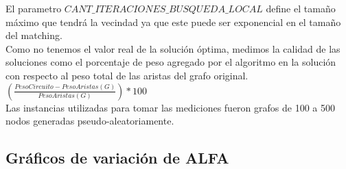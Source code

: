 \documentclass[11pt, a4paper, spanish]{article}
\begin{document}
\noindent El parametro $CANT\_ITERACIONES\_BUSQUEDA\_LOCAL$ define el tama\~{n}o m\'aximo que tendr\'a la vecindad ya que este puede ser exponencial en el tama\~{n}o del matching.\\


Como no tenemos el valor real de la soluci\'on \'optima, medimos la calidad de las soluciones como el porcentaje de peso agregado por el algoritmo en la soluci\'on con respecto al peso total de las aristas del grafo original. $\left(\frac{PesoCircuito - PesoAristas(G)}{PesoAristas(G)}\right)*100$\\
Las instancias utilizadas para tomar las mediciones fueron grafos de 100 a 500 nodos generadas pseudo-aleatoriamente.\\

\newpage
\subsection{Gr\'aficos de variaci\'on de ALFA}
\end{document}
